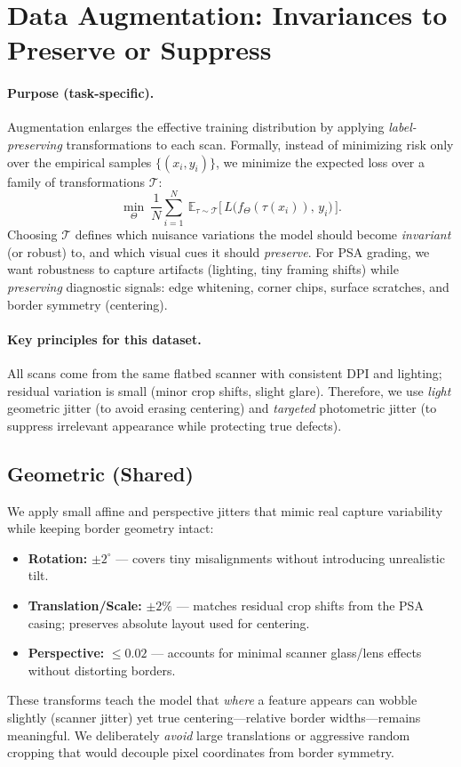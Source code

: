\documentclass[12pt]{article}
\begin{document}
\section{Data Augmentation: Invariances to Preserve or Suppress}
\label{sec:augmentation}

\paragraph{Purpose (task-specific).}
Augmentation enlarges the effective training distribution by applying \emph{label-preserving} transformations to each scan.
Formally, instead of minimizing risk only over the empirical samples $\{(x_i,y_i)\}$, we minimize the expected loss over a family of transformations $\mathcal{T}$:
\[
\min_\Theta \ \frac{1}{N}\sum_{i=1}^N \ \mathbb{E}_{\tau\sim\mathcal{T}} \big[\, L\big(f_\Theta(\tau(x_i)),\, y_i\big) \,\big].
\]
Choosing $\mathcal{T}$ defines which nuisance variations the model should become \emph{invariant} (or robust) to, and which visual cues it should \emph{preserve}.
For PSA grading, we want robustness to capture artifacts (lighting, tiny framing shifts) while \emph{preserving} diagnostic signals: edge whitening, corner chips, surface scratches, and border symmetry (centering).

\paragraph{Key principles for this dataset.}
All scans come from the same flatbed scanner with consistent DPI and lighting; residual variation is small (minor crop shifts, slight glare). 
Therefore, we use \emph{light} geometric jitter (to avoid erasing centering) and \emph{targeted} photometric jitter (to suppress irrelevant appearance while protecting true defects).

\subsection{Geometric (Shared)}
\label{subsec:aug-geom}
We apply small affine and perspective jitters that mimic real capture variability while keeping border geometry intact:
\begin{itemize}
  \item \textbf{Rotation:} $\pm 2^\circ$ — covers tiny misalignments without introducing unrealistic tilt.
  \item \textbf{Translation/Scale:} $\pm 2\%$ — matches residual crop shifts from the PSA casing; preserves absolute layout used for centering.
  \item \textbf{Perspective:} $\le 0.02$ — accounts for minimal scanner glass/lens effects without distorting borders.
\end{itemize}
These transforms teach the model that \emph{where} a feature appears can wobble slightly (scanner jitter) yet true centering—relative border widths—remains meaningful.
We deliberately \emph{avoid} large translations or aggressive random cropping that would decouple pixel coordinates from border symmetry.
\end{document}
